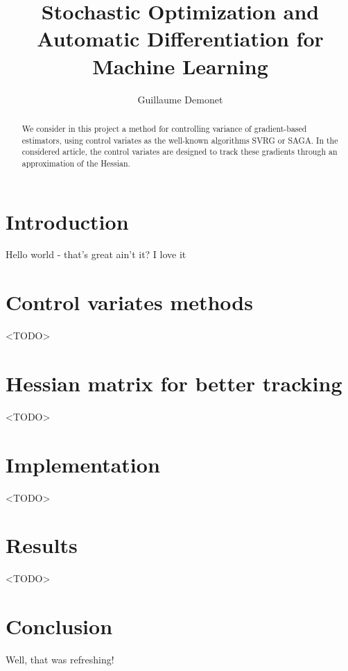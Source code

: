 \documentclass{article}
\begin{document}
\title{Stochastic Optimization and Automatic Differentiation for Machine Learning}
\author{Guillaume Demonet}

\maketitle

\begin{abstract}
We consider in this project a method for controlling variance of gradient-based
estimators, using control variates as the well-known algorithms SVRG or SAGA.
In the considered article, the control variates are designed to track these
gradients through an approximation of the Hessian.
\end{abstract}

\section*{Introduction}

Hello world - that's great ain't it? I love it

\section{Control variates methods}

<TODO>

\section{Hessian matrix for better tracking}

<TODO>

\section{Implementation}

<TODO>

%

\section{Results}

<TODO>

%

\section*{Conclusion}

Well, that was refreshing!
\end{document}
